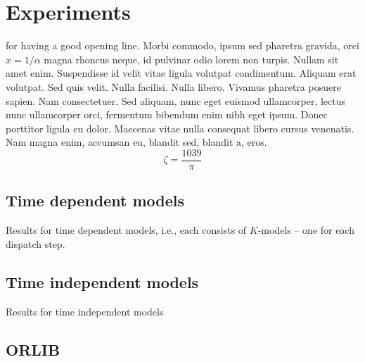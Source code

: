 

\chapter{Experiments }\label{ch:experiments} 

 for having a good opening line. Morbi commodo, ipsum sed pharetra gravida, orci  $x = 1/\alpha$ magna rhoncus neque, id pulvinar odio lorem non turpis. Nullam sit amet enim. Suspendisse id velit vitae ligula volutpat condimentum. Aliquam erat volutpat. Sed quis velit. Nulla facilisi. Nulla libero. Vivamus pharetra posuere sapien. Nam consectetuer. Sed aliquam, nunc eget euismod ullamcorper, lectus nunc ullamcorper orci, fermentum bibendum enim nibh eget ipsum. Donec porttitor ligula eu dolor. Maecenas vitae nulla consequat libero cursus venenatis. Nam magna enim, accumsan eu, blandit sed, blandit a, eros.
$$\zeta = \frac{1039}{\pi}$$


\section{Time dependent models}
\begin{table}[t]
    \caption[Results for time dependent models]{Results for time dependent 
    models, i.e., each consists of $K$-models -- one for each dispatch step. 
    }\label{tbl:compare:dependent}
\end{table}

\section{Time independent models}
\begin{table}[t]
    \caption{Results for time independent models}\label{tbl:compare:independent}
\end{table}

\section{ORLIB}
%
%



